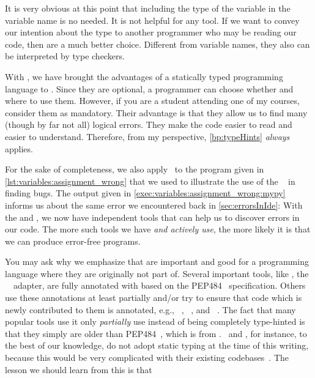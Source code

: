 It is very obvious at this point that including the type of the variable in the variable name is no needed.
It is not helpful for any tool.
If we want to convey our intention about the type to another programmer who may be reading our code, then  are a much better choice.
Different from variable names, they also can be interpreted by type checkers.

With , we have brought the advantages of a statically typed programming language to \python.
Since they are optional, a programmer can choose whether and where to use them.
However, if you are a student attending one of my courses, consider them as mandatory.
Their advantage is that they allow us to find many (though by far not all) logical errors.
They make the code easier to read and easier to understand.
Therefore, from my perspective, \cref{bp:typeHints} \emph{always} applies.

%
%
For the sake of completeness, we also apply \mypy\ to the program  given in \cref{lst:variables:assignment_wrong} that we used to illustrate the use of the \pycharm\  in finding bugs.
The output given in \cref{exec:variables:assignment_wrong:mypy} informs us about the same error we encountered back in \cref{sec:errorsInIde}:
\emph{}
With the  and \mypy, we now have independent tools that can help us to discover errors in our code.
The more such tools we have \emph{and actively use}, the more likely it is that we can produce error-free programs.

You may ask why we emphasize that  are important and good for a programming language where they are originally not part of.
Several important tools, like \psycopg, the \postgresql\ \python\ adapter, are fully annotated with  based on the PEP484~\cite{PEP484} specification.
Others use these annotations at least partially and/or try to ensure that code which is newly contributed to them is annotated, e.g., \matplotlib~\cite{HDFDM2012MVWPCG}, \numpy~\cite{N2025NTNT}, and \pandas~\cite{PD2025PCTTCB}.
The fact that many popular tools use it only \emph{partially} use instead of being completely type-hinted is that they simply are older than PEP484~\cite{PEP484}, which is from \citeyear{PEP484}.
\scikitlearn\ and \scipy, for instance, to the best of our knowledge, do not adopt static typing at the time of this writing, because this would be very complicated with their existing codebases~\cite{CFNYLH2020ST,DPVPCHG2018ATHFS}.
The lesson we should learn from this is that%
%
%
%
\FloatBarrier%
\endhsection%
%
\endhsection%
%
